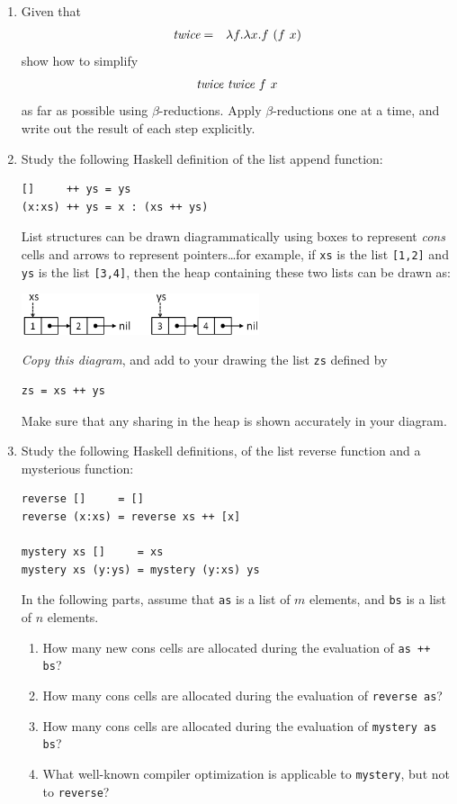 \documentclass{article}
\begin{document}
\begin{enumerate}

\newcommand{\id}[1]{\mbox{\it #1}}

\item Given that
\begin{eqnarray*}
\id{twice} &=& \lambda f.\lambda x.f~(f~x)
\end{eqnarray*}
show how to simplify 
\[ \id{twice}~\id{twice}~f~x \]
as far as possible using $\beta$-reductions.  Apply $\beta$-reductions
one at a time, and write out the result of each step explicitly.

\item 
Study the following Haskell definition of the list append function:
\begin{verbatim}
[]     ++ ys = ys
(x:xs) ++ ys = x : (xs ++ ys)
\end{verbatim}
List structures can be drawn diagrammatically using boxes to represent
{\em cons} cells and arrows to represent pointers\dots for example, if
\verb!xs! is the list \verb![1,2]! and \verb!ys! is the list
\verb![3,4]!, then the heap containing these two lists can be drawn
as:
\begin{center}
\includegraphics[width=7cm]{Lists.jpg}
\end{center}
{\em Copy this diagram}, and add to your drawing the list \verb!zs! defined by
\begin{verbatim}
zs = xs ++ ys
\end{verbatim}
Make sure that any sharing in the heap is shown accurately in your diagram.

\item
Study the following Haskell definitions, of the list reverse function
and a mysterious function:
\begin{verbatim}
reverse []     = []
reverse (x:xs) = reverse xs ++ [x]

mystery xs []     = xs
mystery xs (y:ys) = mystery (y:xs) ys
\end{verbatim}
In the following parts, assume that \verb!as! is a list of $m$
elements, and \verb!bs! is a list of $n$ elements.
\begin{enumerate}
\item
How many new cons cells are allocated during the evaluation of
\verb!as ++ bs!?
\item
How many cons cells are
allocated during the evaluation of \verb!reverse as!?
\item
How many cons cells are allocated during the evaluation of
\verb!mystery as bs!?
\item
What well-known compiler optimization is applicable to \verb!mystery!,
but not to \verb!reverse!?


\end{enumerate}
\end{enumerate}
\end{document}
